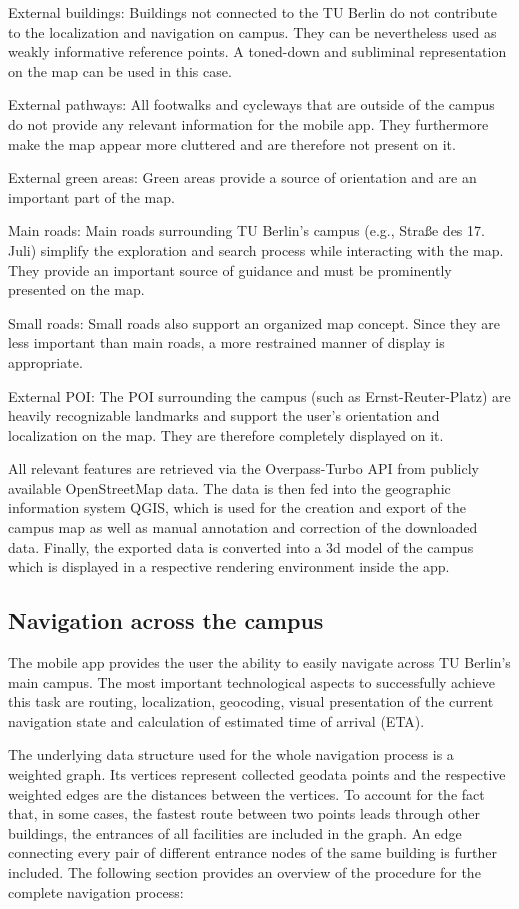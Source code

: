 External buildings: Buildings not connected to the TU Berlin do not contribute to the localization and navigation on campus. They can be nevertheless used as weakly informative reference points. A toned-down and subliminal representation on the map can be used in this case.

External pathways: All footwalks and cycleways that are outside of the campus do not provide any relevant information for the mobile app. They furthermore make the map appear more cluttered and are therefore not present on it.

External green areas: Green areas provide a source of orientation and are an important part of the map.

Main roads: Main roads surrounding TU Berlin's campus (e.g., Straße des 17. Juli) simplify the exploration and search process while interacting with the map. They provide an important source of guidance and must be prominently presented on the map.

Small roads: Small roads also support an organized map concept. Since they are less important than main roads, a more restrained manner of display is appropriate.

External POI: The POI surrounding the campus (such as Ernst-Reuter-Platz) are heavily recognizable landmarks and support the user's orientation and localization on the map. They are therefore completely displayed on it.

All relevant features are retrieved via the Overpass-Turbo API from publicly available OpenStreetMap data. The data is then fed into the geographic information system QGIS, which is used for the creation and export of the campus map as well as manual annotation and correction of the downloaded data. Finally, the exported data is converted into a 3d model of the campus which is displayed in a respective rendering environment inside the app.

\subsection{Navigation across the campus}
The mobile app provides the user the ability to easily navigate across TU Berlin's main campus. The most important technological aspects to successfully achieve this task are routing, localization, geocoding, visual presentation of the current navigation state and calculation of estimated time of arrival (ETA).

The underlying data structure used for the whole navigation process is a weighted graph. Its vertices represent collected geodata points and the respective weighted edges are the distances between the vertices. To account for the fact that, in some cases, the fastest route between two points leads through other buildings, the entrances of all facilities are included in the graph. An edge connecting every pair of different entrance nodes of the same building is further included. The following section provides an overview of the procedure for the complete navigation process:

